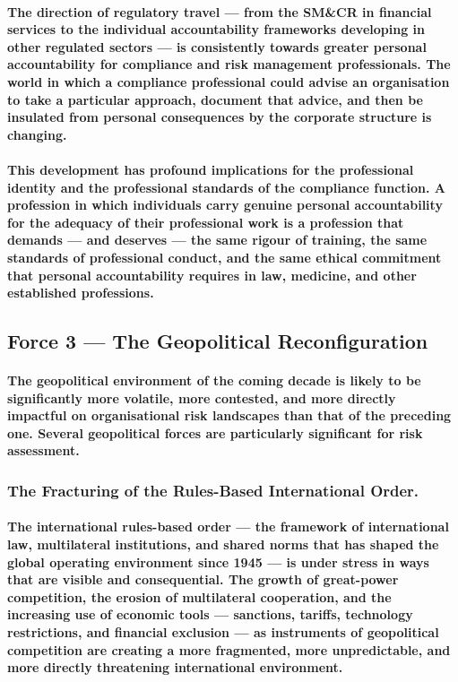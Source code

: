 \paragraph{The direction of regulatory travel — from the SM\&CR in financial services to the individual accountability frameworks developing in other regulated sectors — is consistently towards greater personal accountability for compliance and risk management professionals. The world in which a compliance professional could advise an organisation to take a particular approach, document that advice, and then be insulated from personal consequences by the corporate structure is changing.}
\paragraph{This development has profound implications for the professional identity and the professional standards of the compliance function. A profession in which individuals carry genuine personal accountability for the adequacy of their professional work is a profession that demands — and deserves — the same rigour of training, the same standards of professional conduct, and the same ethical commitment that personal accountability requires in law, medicine, and other established professions.}

\subsection{Force 3 — The Geopolitical Reconfiguration}
\paragraph{The geopolitical environment of the coming decade is likely to be significantly more volatile, more contested, and more directly impactful on organisational risk landscapes than that of the preceding one. Several geopolitical forces are particularly significant for risk assessment.}
\subsubsection{The Fracturing of the Rules-Based International Order.}
\paragraph{The international rules-based order — the framework of international law, multilateral institutions, and shared norms that has shaped the global operating environment since 1945 — is under stress in ways that are visible and consequential. The growth of great-power competition, the erosion of multilateral cooperation, and the increasing use of economic tools — sanctions, tariffs, technology restrictions, and financial exclusion — as instruments of geopolitical competition are creating a more fragmented, more unpredictable, and more directly threatening international environment.}
